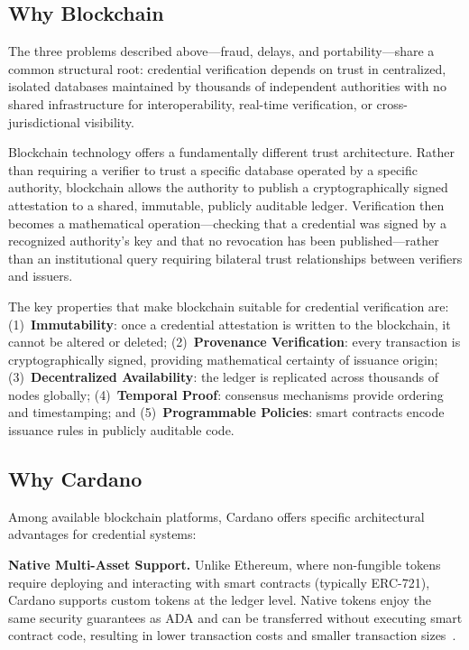 \documentclass[conference,10pt]{IEEEtran}
\begin{document}
\subsection{Why Blockchain}

The three problems described above---fraud, delays, and portability---share a common structural root: credential verification depends on trust in centralized, isolated databases maintained by thousands of independent authorities with no shared infrastructure for interoperability, real-time verification, or cross-jurisdictional visibility.

Blockchain technology offers a fundamentally different trust architecture. Rather than requiring a verifier to trust a specific database operated by a specific authority, blockchain allows the authority to publish a cryptographically signed attestation to a shared, immutable, publicly auditable ledger. Verification then becomes a mathematical operation---checking that a credential was signed by a recognized authority's key and that no revocation has been published---rather than an institutional query requiring bilateral trust relationships between verifiers and issuers.

The key properties that make blockchain suitable for credential verification are: (1)~\textbf{Immutability}: once a credential attestation is written to the blockchain, it cannot be altered or deleted; (2)~\textbf{Provenance Verification}: every transaction is cryptographically signed, providing mathematical certainty of issuance origin; (3)~\textbf{Decentralized Availability}: the ledger is replicated across thousands of nodes globally; (4)~\textbf{Temporal Proof}: consensus mechanisms provide ordering and timestamping; and (5)~\textbf{Programmable Policies}: smart contracts encode issuance rules in publicly auditable code.

\subsection{Why Cardano}

Among available blockchain platforms, Cardano offers specific architectural advantages for credential systems:

\textbf{Native Multi-Asset Support.} Unlike Ethereum, where non-fungible tokens require deploying and interacting with smart contracts (typically ERC-721), Cardano supports custom tokens at the ledger level. Native tokens enjoy the same security guarantees as ADA and can be transferred without executing smart contract code, resulting in lower transaction costs and smaller transaction sizes~\cite{chakravarty2020}.
\end{document}
